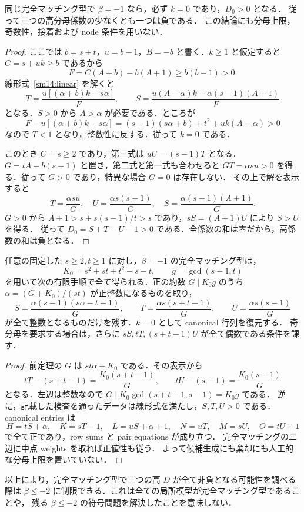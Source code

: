 \begin{theorem}[$\beta=-1$ の境界と高係数の負性]
\label{sm14:beta-boundary}
同じ完全マッチング型で $\beta=-1$ なら，必ず $k=0$ であり，$D_0>0$ となる．
従って三つの高分母係数の少なくとも一つは負である．
この結論にも分母上限，奇数性，接着および node 条件を用いない．
\end{theorem}

\begin{proof}
ここでは $b=s+t$，$u=b-1$，$B=-b$ と書く．$k\geq1$ と仮定すると
$C=s+uk\geq b$ であるから
\[
 F=C(A+b)-b(A+1)\geq b(b-1)>0.
\]
線形式~\eqref{sm14:linear} を解くと
\[
 T=\frac{u[(\alpha+b)k-s\alpha]}{F},\qquad
 S=\frac{u(A-\alpha)k-\alpha(s-1)(A+1)}{F}
\]
となる．$S>0$ から $A>\alpha$ が必要である．ところが
\[
 F-u[(\alpha+b)k-s\alpha]
 =(s-1)(s\alpha+b)+t^2+uk(A-\alpha)>0
\]
なので $T<1$ となり，整数性に反する．従って $k=0$ である．

このとき $C=s\geq2$ であり，第三式は $uU=(s-1)T$ となる．
$G=tA-b(s-1)$ と置き，第二式と第一式も合わせると
$GT=\alpha su>0$ を得る．従って $G>0$ であり，特異な場合 $G=0$ は存在しない．
その上で解を表示すると
\[
 T=\frac{\alpha su}{G},\quad
 U=\frac{\alpha s(s-1)}{G},\quad
 S=\frac{\alpha(s-1)(A+1)}{G}.
\]
$G>0$ から
$A+1>s+s(s-1)/t>s$ であり，$sS=(A+1)U$ により $S>U$ を得る．
従って $D_0=S+T-U-1>0$ である．全係数の和は零だから，高係数の和は負となる．
\end{proof}

\begin{corollary}[$\beta=-1$ の全整数模型を与える有限な約数手順]
\label{sm14:beta-boundary-factorization}
任意の固定した $s\geq2,t\geq1$ に対し，$\beta=-1$ の完全マッチング型は，
\[
 K_0=s^2+st+t^2-s-t,\qquad g=\gcd(s-1,t)
\]
を用いて次の有限手順で全て得られる．正の約数 $G\mid K_0g$ のうち
$\alpha=(G+K_0)/(st)$ が正整数になるものを取り，
\[
 S=\frac{\alpha(s-1)(s\alpha-t+1)}G,\qquad
 T=\frac{\alpha s(s+t-1)}G,\qquad
 U=\frac{\alpha s(s-1)}G
\]
が全て整数となるものだけを残す．$k=0$ として canonical 行列を復元する．
奇分母を要求する場合は，さらに $sS,tT,(s+t-1)U$ が全て偶数である条件を課す．
\end{corollary}

\begin{proof}
前定理の $G$ は $st\alpha-K_0$ である．その表示から
\[
 tT-(s+t-1)=\frac{K_0(s+t-1)}G,
 \qquad tU-(s-1)=\frac{K_0(s-1)}G
\]
となる．左辺は整数なので
$G\mid K_0\gcd(s+t-1,s-1)=K_0g$ である．
逆に，記載した検査を通ったデータは線形式を満たし，$S,T,U>0$ である．
canonical entries は
\[
 H=tS+\alpha,\quad K=sT-1,\quad
 L=uS+\alpha+1,\quad N=uT,\quad M=sU,\quad O=tU+1
\]
で全て正であり，row sums と pair equations が成り立つ．
完全マッチングの二辺に中点 weights を取れば正値性も従う．
よって候補生成にも棄却にも人工的な分母上限を置いていない．
\end{proof}

以上により，完全マッチング型で三つの高 $D$ が全て非負となる可能性を調べる際は
$\beta\leq-2$ に制限できる．これは全ての局所模型が完全マッチング型であることや，
残る $\beta\leq-2$ の符号問題を解決したことを意味しない．
